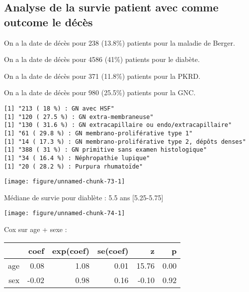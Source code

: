 \documentclass[11pt,a4paper]{article}\usepackage[]{graphicx}\usepackage[]{color}
\makeatletter
\def\maxwidth{ %
  \ifdim\Gin@nat@width>\linewidth
    \linewidth
  \else
    \Gin@nat@width
  \fi
}
\newenvironment{kframe}{%
 \def\at@end@of@kframe{}%
 \ifinner\ifhmode%
  \def\at@end@of@kframe{\end{minipage}}%
  \begin{minipage}{\columnwidth}%
 \fi\fi%
 \def\FrameCommand##1{\hskip\@totalleftmargin \hskip-\fboxsep
 \colorbox{shadecolor}{##1}\hskip-\fboxsep
     \hskip-\linewidth \hskip-\@totalleftmargin \hskip\columnwidth}%
 \MakeFramed {\advance\hsize-\width
   \@totalleftmargin\z@ \linewidth\hsize
   \@setminipage}}%
 {\par\unskip\endMakeFramed%
 \at@end@of@kframe}
\newenvironment{knitrout}{}{} %
\makeatother
\begin{document}
  \subsection{Analyse de la survie patient avec comme outcome le décès}
  
  On a la date de décès pour 238 (13.8\%) patients pour la maladie de Berger.
  
  On a la date de décès pour 4586 (41\%) patients pour le diabète.
  
  On a la date de décès pour 371 (11.8\%) patients pour la PKRD.
  
  On a la date de décès pour 980 (25.5\%) patients pour la GNC.

\begin{knitrout}
\color{fgcolor}\begin{kframe}
\begin{verbatim}
[1] "213 ( 18 %) : GN avec HSF"
[1] "120 ( 27.5 %) : GN extra-membraneuse"
[1] "130 ( 31.6 %) : GN extracapillaire ou endo/extracapillaire"
[1] "61 ( 29.8 %) : GN membrano-proliférative type 1"
[1] "14 ( 17.3 %) : GN membrano-proliférative type 2, dépôts denses"
[1] "388 ( 31 %) : GN primitive sans examen histologique"
[1] "34 ( 16.4 %) : Néphropathie lupique"
[1] "20 ( 28.2 %) : Purpura rhumatoïde"
\end{verbatim}
\end{kframe}
\end{knitrout}


\begin{knitrout}
\color{fgcolor}
\texttt{[image: figure/unnamed-chunk-73-1]} 

\end{knitrout}

Médiane de survie pour diablète : 5.5 ans [5.25-5.75]

\begin{knitrout}
\color{fgcolor}
\texttt{[image: figure/unnamed-chunk-74-1]} 

\end{knitrout}

Cox sur age + sexe :
\begin{table}[H]
\centering
\begin{tabular}{rrrrrr}
  \hline
 & coef & exp(coef) & se(coef) & z & p \\ 
  \hline
age & 0.08 & 1.08 & 0.01 & 15.76 & 0.00 \\ 
  sex & -0.02 & 0.98 & 0.16 & -0.10 & 0.92 \\ 
   \hline
\end{tabular}
\end{table}
\end{document}
